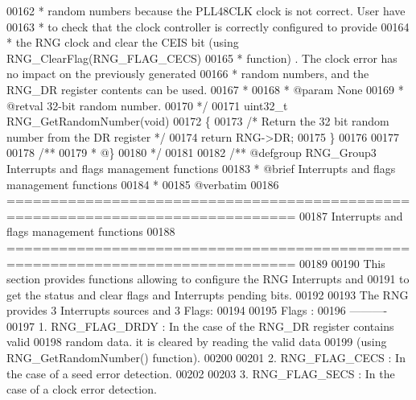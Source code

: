 \begin{DoxyCode}
00162 \textcolor{comment}{  *         random numbers because the PLL48CLK clock is not correct. User have }
00163 \textcolor{comment}{  *         to check that the clock controller is correctly configured to provide}
00164 \textcolor{comment}{  *         the RNG clock and clear the CEIS bit (using RNG\_ClearFlag(RNG\_FLAG\_CECS) }
00165 \textcolor{comment}{  *         function) . The clock error has no impact on the previously generated }
00166 \textcolor{comment}{  *         random numbers, and the RNG\_DR register contents can be used.}
00167 \textcolor{comment}{  *         }
00168 \textcolor{comment}{  * @param  None}
00169 \textcolor{comment}{  * @retval 32-bit random number.}
00170 \textcolor{comment}{  */}
00171 uint32\_t RNG_GetRandomNumber(\textcolor{keywordtype}{void})
00172 \{
00173   \textcolor{comment}{/* Return the 32 bit random number from the DR register */}
00174   \textcolor{keywordflow}{return} RNG->DR;
00175 \}
00176 
00177 
00178 \textcolor{comment}{/**}
00179 \textcolor{comment}{  * @\}}
00180 \textcolor{comment}{  */}
00181 
00182 \textcolor{comment}{/** @defgroup RNG\_Group3 Interrupts and flags management functions}
00183 \textcolor{comment}{ *  @brief   Interrupts and flags management functions}
00184 \textcolor{comment}{ *}
00185 \textcolor{comment}{@verbatim   }
00186 \textcolor{comment}{ ===============================================================================}
00187 \textcolor{comment}{                   Interrupts and flags management functions}
00188 \textcolor{comment}{ ===============================================================================  }
00189 \textcolor{comment}{}
00190 \textcolor{comment}{  This section provides functions allowing to configure the RNG Interrupts and }
00191 \textcolor{comment}{  to get the status and clear flags and Interrupts pending bits.}
00192 \textcolor{comment}{  }
00193 \textcolor{comment}{  The RNG provides 3 Interrupts sources and 3 Flags:}
00194 \textcolor{comment}{  }
00195 \textcolor{comment}{  Flags :}
00196 \textcolor{comment}{  ---------- }
00197 \textcolor{comment}{     1. RNG\_FLAG\_DRDY :  In the case of the RNG\_DR register contains valid }
00198 \textcolor{comment}{                         random data. it is cleared by reading the valid data }
00199 \textcolor{comment}{                         (using RNG\_GetRandomNumber() function).}
00200 \textcolor{comment}{}
00201 \textcolor{comment}{     2. RNG\_FLAG\_CECS : In the case of a seed error detection. }
00202 \textcolor{comment}{      }
00203 \textcolor{comment}{     3. RNG\_FLAG\_SECS : In the case of a clock error detection.}

\end{DoxyCode}
